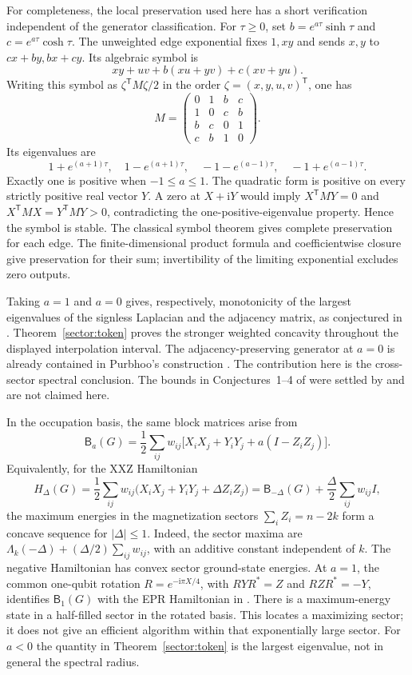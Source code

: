 \documentclass[reqno]{amsart}
\theoremstyle{definition}
\theoremstyle{remark}
\begin{document}
For completeness, the local preservation used here has a short
verification independent of the generator classification. For
\(\tau\ge0\), set \(b=e^{a\tau}\sinh\tau\) and
\(c=e^{a\tau}\cosh\tau\). The unweighted edge exponential fixes
\(1,xy\) and sends \(x,y\) to \(cx+by,bx+cy\).
Its algebraic symbol is
\[
 xy+uv+b(xu+yv)+c(xv+yu).
\]
Writing this symbol as \(\zeta^{\mathsf T}M\zeta/2\) in the
order \(\zeta=(x,y,u,v)^{\mathsf T}\), one has
\[
 M=\begin{pmatrix}
 0&1&b&c\\
 1&0&c&b\\
 b&c&0&1\\
 c&b&1&0
 \end{pmatrix}.
\]
Its eigenvalues are
\[
 1+e^{(a+1)\tau},\quad 1-e^{(a+1)\tau},\quad
 -1-e^{(a-1)\tau},\quad -1+e^{(a-1)\tau}.
\]
Exactly one is positive when \(-1\le a\le1\). The quadratic
form is positive on every strictly positive real vector \(Y\).
A zero at \(X+\mathrm iY\) would imply
\(X^{\mathsf T}MY=0\) and
\(X^{\mathsf T}MX=Y^{\mathsf T}MY>0\), contradicting the
one-positive-eigenvalue property. Hence the symbol is stable.
The classical symbol theorem \cite{BB09} gives complete
preservation for each edge. The finite-dimensional product formula
and coefficientwise closure give preservation for their sum;
invertibility of the limiting exponential excludes zero outputs.

Taking \(a=1\) and \(a=0\) gives, respectively, monotonicity of
the largest eigenvalues of the signless Laplacian and the adjacency
matrix, as conjectured in \cite[Conjectures~5--6]{APS26}.
Theorem~\ref{sector:token} proves the stronger weighted concavity
throughout the displayed interpolation interval.
The adjacency-preserving generator at \(a=0\) is already contained
in Purbhoo's construction \cite[Proposition~4.5]{Purbhoo18}.
The contribution here is the cross-sector spectral conclusion.
The bounds in Conjectures~1--4 of \cite{APS26} were settled by
\cite{BBKL26} and are not claimed here.

In the occupation basis, the same block matrices arise from
\[
 \mathsf B_a(G)=\frac12\sum_{ij}w_{ij}
 \bigl[X_iX_j+Y_iY_j+a(I-Z_iZ_j)\bigr].
\]
Equivalently, for the XXZ Hamiltonian
\[
 H_\Delta(G)=\frac12\sum_{ij}w_{ij}
   \bigl(X_iX_j+Y_iY_j+\Delta Z_iZ_j\bigr)
 =\mathsf B_{-\Delta}(G)+\frac\Delta2\sum_{ij}w_{ij}I,
\]
the maximum energies in the magnetization sectors
\(\sum_i Z_i=n-2k\) form a concave sequence for \(|\Delta|\le1\).
Indeed, the sector maxima are
\(\Lambda_k(-\Delta)+(\Delta/2)\sum_{ij}w_{ij}\), with an additive
constant independent of \(k\). The negative Hamiltonian has convex
sector ground-state energies. At \(a=1\), the common one-qubit
rotation \(R=e^{-\mathrm i\pi X/4}\), with
\(RYR^*=Z\) and \(RZR^*=-Y\), identifies \(\mathsf B_1(G)\) with the
EPR Hamiltonian in \cite{APS26}. There is a
maximum-energy state in a half-filled sector in the rotated basis.
This locates a maximizing sector; it does not give an efficient
algorithm within that exponentially large sector. For \(a<0\)
the quantity in Theorem~\ref{sector:token} is the largest
eigenvalue, not in general the spectral radius.
\end{document}
